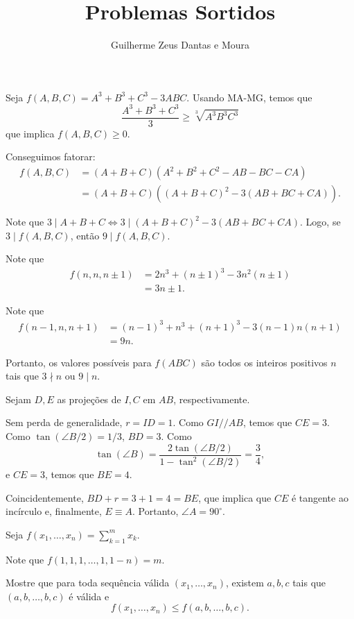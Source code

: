 \documentclass[10pt,a4paper]{article}
\title{Problemas Sortidos}
\author{Guilherme Zeus Dantas e Moura}
\begin{document}
	
	\zeustitle

	\begin{sol}
		Seja $f(A, B, C) = A^3 + B^3 + C^3 - 3ABC$.
		Usando MA-MG, temos que \[
			\frac{A^3 + B^3 + C^3}{3} \ge \sqrt[3]{A^3B^3C^3}
		\] que implica $f(A, B, C) \ge 0$.

		Conseguimos fatorar:
		\begin{align*}
			f(A, B, C) &= (A + B + C)(A^2 + B^2 + C^2 - AB - BC - CA)\\
					   &= (A + B + C)((A+B+C)^2 - 3(AB + BC + CA)).
		\end{align*}

		Note que $3 \mid A + B + C \iff 3 \mid (A+B+C)^2 - 3(AB+BC+CA)$. Logo, se $3 \mid f(A,B,C)$, então $9 \mid f(A, B, C)$.

		Note que
		\begin{align*}
			f(n, n, n \pm 1) &= 2n^3 + (n \pm 1)^3 - 3n^2(n \pm 1) \\
						     &= 3n \pm 1.
		\end{align*}
		
		Note que
		\begin{align*}
			f(n-1, n, n+1) &= (n-1)^3 + n^3 + (n+1)^3 - 3(n-1)n(n+1) \\
						   &= 9n.
		\end{align*}

		Portanto, os valores possíveis para $f(ABC)$ são todos os inteiros positivos $n$ tais que $3 \nmid n$ ou $9 \mid n$.
	\end{sol}

	\newpage
	\begin{sol}
		Sejam $D, E$ as projeções de $I, C$ em $AB$, respectivamente.
		
		Sem perda de generalidade, $r = ID = 1$. Como $GI // AB$, temos que $CE = 3$. Como $\tan(\angle B / 2) = 1/3$, $BD = 3$. Como  \[
			\tan(\angle B) = \frac{2\tan(\angle B / 2)}{1 - \tan^2(\angle B / 2)} = \frac{3}{4},
		\] e $CE = 3$, temos que $BE = 4$.

		Coincidentemente, $BD + r = 3 + 1 = 4 = BE$, que implica que $CE$ é tangente ao incírculo e, finalmente, $E \equiv A$. Portanto, $\angle A = 90^\circ$.
	\end{sol}

	\newpage
	\begin{sk}
		Seja $f(x_1, \dots, x_n) = \sum_{k=1}^m  x_k$.

		Note que  $f(1, 1, 1, \dots, 1, 1 - n) = m$.

		Mostre que para toda sequência válida $(x_1, \dots, x_n)$, existem $a, b, c$ tais que $(a, b, \dots, b, c)$ é válida e  \[
			f(x_1, \dots, x_n) \le f(a, b, \dots, b, c).
		\]
	\end{sk}
\end{document}
